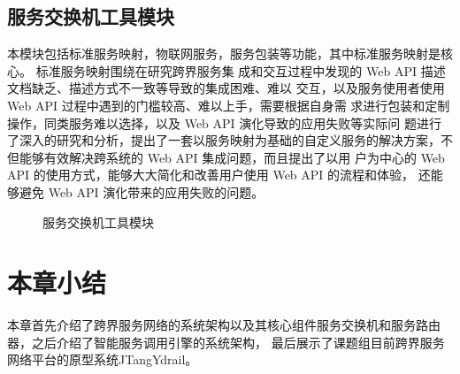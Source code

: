   \subsection{服务交换机工具模块}
  本模块包括标准服务映射，物联网服务，服务包装等功能，其中标准服务映射是核心。
  标准服务映射围绕在研究跨界服务集
  成和交互过程中发现的 Web API 描述文档缺乏、描述方式不一致等导致的集成困难、难以
  交互，以及服务使用者使用 Web API 过程中遇到的门槛较高、难以上手，需要根据自身需
  求进行包装和定制操作，同类服务难以选择，以及 Web API 演化导致的应用失败等实际问
  题进行了深入的研究和分析，提出了一套以服务映射为基础的自定义服务的解决方案，不但能够有效解决跨系统的 Web API 集成问题，而且提出了以用
  户为中心的 Web API 的使用方式，能够大大简化和改善用户使用 Web API 的流程和体验，
还能够避免 Web API 演化带来的应用失败的问题。
  \begin{figure}[htbp]
    \caption{服务交换机工具模块}
    \label{fig:fuwugongju}
    \end{figure}
\section{本章小结}
本章首先介绍了跨界服务网络的系统架构以及其核心组件服务交换机和服务路由器，之后介绍了智能服务调用引擎的系统架构，
最后展示了课题组目前跨界服务网络平台的原型系统JTangYdrail。
